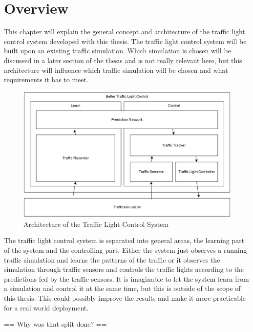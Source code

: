 \section{Overview}

This chapter will explain the general concept and architecture of the traffic light control system developed with this thesis. The traffic light control system will be built upon an existing traffic simulation. Which simulation is chosen will be discussed in a later section of the thesis and is not really relevant here, but this architecture will influence which traffic simulation will be chosen and what requirements it has to meet.

\begin{figure}[ht]
  \centering
  \includegraphics[width=16cm]{figures/architecture}
  \caption[Architecture of the Traffic Light Control System]{Architecture of the Traffic Light Control System \protect\footnotemark}
  \label{architecture}
\end{figure}


The traffic light control system is separated into general areas, the learning part of the system and the controlling part. Either the system just observes a running traffic simulation and learns the patterns of the traffic or it observes the simulation through traffic sensors and controls the traffic lights according to the predictions fed by the traffic sensors. It is imaginable to let the system learn from a simulation and control it at the same time, but this is outside of the scope of this thesis. This could possibly improve the results and make it more practicable for a real world deployment.

== Why was that split done? ==

